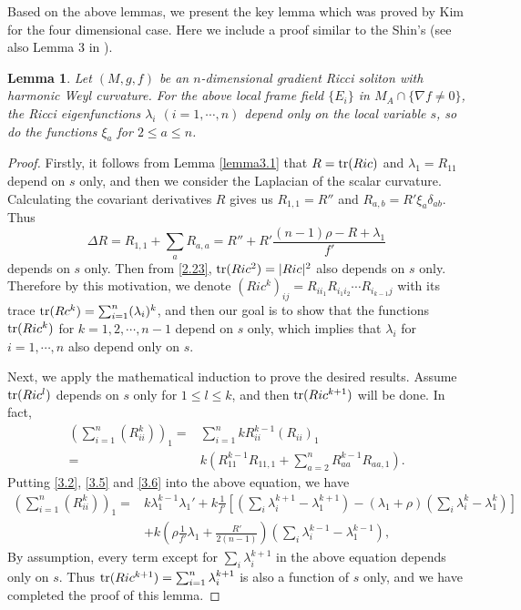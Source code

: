 \documentclass{amsart}
\newtheorem{lemma}[theorem]{Lemma}
\theoremstyle{definition}
\theoremstyle{remark}
\numberwithin{equation}{section}
\begin{document}
	Based on the above lemmas, we present the key lemma which was proved by Kim \cite{Kim} for the four dimensional case. 
	Here we include a proof 
	similar to the Shin's (see also Lemma 3 in \cite{S}).
	\begin{lemma} \label{lemma3.3}
		Let $(M, g, f)$ be an $n$-dimensional gradient Ricci soliton  with harmonic Weyl curvature.
		For the above local frame field $\{ E_i \}$ in $M_{A} \cap \{ \nabla f \neq 0 \}$,
		the Ricci eigenfunctions $ \lambda_i $ $(i=1, \cdots ,n)$
		depend only on the local variable $s$, so do the functions $\xi_a$ for $2 \leq a\leq n$.
	\end{lemma}
	
	\begin{proof}
		Firstly, it follows from Lemma \ref{lemma3.1} that $R={\rm tr}(Ric)$ and $\lambda_1= R_{11}$ depend on $s$ only,
		and then we consider the Laplacian of the scalar curvature.	Calculating the covariant derivatives $R$ gives us
		$R_{1,1}=R''$ and $R_{a,b}=R' \xi_a \delta_{ab}$. Thus
	\[
	\Delta R=R_{1,1}+\sum\limits_{a}R_{a,a}=R''+R'\frac{(n-1)\rho-R+\lambda_1}{f'}
	\]
		depends on $s$ only. Then from \eqref{2.23},
		${\rm tr}(Ric^2)=|Ric|^{2}$ also depends on $s$ only.
		Therefore by this motivation, we denote
		$(Ric^k)_{ij}= R_{i i_1} R_{i_1 i_2} \cdots R_{i_{k-1} j}$
		with its trace ${\rm tr}(Rc^k)= \sum_{i=1}^n (\lambda_i)^k$,
       and then	our goal is to show that 
		the functions ${\rm tr}(Ric^k)$ for $k=1,2, \cdots, n-1$ depend on $s$ only, 
		which implies that $ \lambda_i $ for $i=1, \cdots ,n$ also depend only on $s$.
		
		Next, we apply the mathematical induction to prove the desired results.
		Assume ${\rm tr} (Ric^l)$ depends on $s$ only for $1\leq l \leq k$, 
		and then ${\rm tr}(Ric^{k+1})$ will be done.  In fact,
		\begin{align*}
		\left( \sum_{i=1}^n(R_{ii}^k)\right) _1=&\sum_{i=1}^nk R_{ii}^{k-1}(R_{ii})_1\\
		=&k\left(  R_{11}^{k-1}R_{11,1} + \sum_{a=2}^n R_{aa}^{k-1}R_{aa,1}\right).
		\end{align*}
		Putting \eqref{3.2}, \eqref{3.5} and \eqref{3.6} into the above equation,  we have
			\begin{align*}
		\left( \sum_{i=1}^n(R_{ii}^k)\right) _1
		=&k\lambda^{k-1}_1\lambda_1'
		+k\frac{1}{f'}\left[(\sum_{i}\lambda^{k+1}_i -\lambda^{k+1}_1)-(\lambda_1+\rho)(\sum_{i}\lambda^{k}_i -\lambda^{k}_1)\right]\\
		&+k\left( \rho\frac{1}{f'}\lambda_1+\frac{R'}{2(n-1)}\right)\left(\sum_{i}\lambda^{k-1}_i -\lambda^{k-1}_1\right),
		\end{align*}
		By assumption, every term except for $\sum_{i}\lambda_{i}^{k+1}$ in the above equation depends only on $s$.
		Thus ${\rm tr}(Ric^{k+1})=\sum_{i=1}^n \lambda_{i}^{k+1} $ is also a function of $s$ only, 
		and we have completed the proof of this lemma.
	\end{proof}
	
\end{document}
